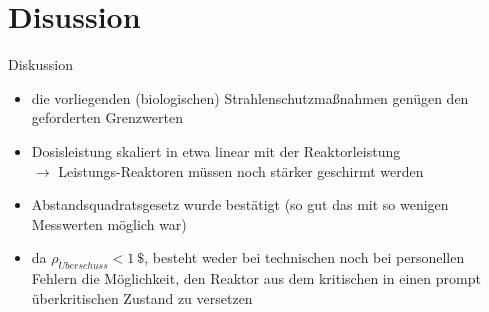 \documentclass[10pt]{beamer}
\begin{document}
 \section{Disussion}
 	\begin{frame}{Diskussion}
 		\begin{itemize}
	 		\item die vorliegenden (biologischen) Strahlenschutzmaßnahmen genügen den geforderten Grenzwerten
	 		\item Dosisleistung skaliert in etwa linear mit der Reaktorleistung\\
	 		$\rightarrow$ Leistungs-Reaktoren müssen noch stärker geschirmt werden
	 		\item Abstandsquadratsgesetz wurde bestätigt (so gut das mit so wenigen Messwerten möglich war)
	 		\item da $\rho_{\ddot{U}berschuss} < 1\ \unit{\$}$, besteht weder bei technischen noch bei personellen Fehlern die Möglichkeit, den Reaktor aus dem kritischen in einen prompt überkritischen Zustand zu versetzen
 		\end{itemize}
 	\end{frame}
 
\end{document}
